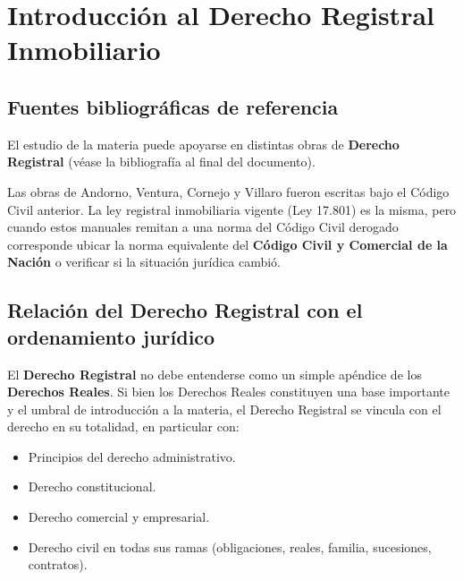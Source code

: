 \documentclass[12pt,oneside]{book}
\begin{document}
\tableofcontents

\clearpage


\chapter{Introducción al Derecho Registral Inmobiliario}

\section{Fuentes bibliográficas de referencia}

El estudio de la materia puede apoyarse en distintas obras de \textbf{Derecho Registral} (véase la bibliografía al final del documento).

\begin{important}
Las obras de Andorno, Ventura, Cornejo y Villaro fueron escritas bajo el Código Civil anterior. La ley registral inmobiliaria vigente (Ley 17.801) es la misma, pero cuando estos manuales remitan a una norma del Código Civil derogado corresponde ubicar la norma equivalente del \textbf{Código Civil y Comercial de la Nación} o verificar si la situación jurídica cambió.
\end{important}

\section{Relación del Derecho Registral con el ordenamiento jurídico}

El \textbf{Derecho Registral} no debe entenderse como un simple apéndice de los \textbf{Derechos Reales}. Si bien los Derechos Reales constituyen una base importante y el umbral de introducción a la materia, el Derecho Registral se vincula con el derecho en su totalidad, en particular con:

\begin{itemize}
    \item Principios del derecho administrativo.
    \item Derecho constitucional.
    \item Derecho comercial y empresarial.
    \item Derecho civil en todas sus ramas (obligaciones, reales, familia, sucesiones, contratos).
\end{itemize}
\end{document}
